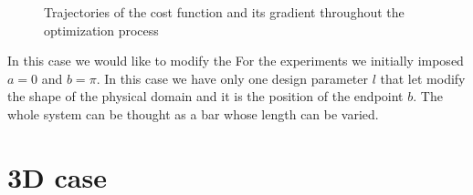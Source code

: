 \begin{figure}
	\centering
	 \quad
	\caption{Trajectories of the cost function and its gradient throughout the optimization process}
	\label{fig:opt_history_1D}
\end{figure}

In this case we would like to modify the 
For the experiments we initially imposed $a=0$ and $b=\pi$.
In this case we have only one design parameter $l$ that let modify the shape of the physical domain and it is the position of the endpoint $b$. The whole  system can be thought as a bar whose length can be varied.



\section{3D case}